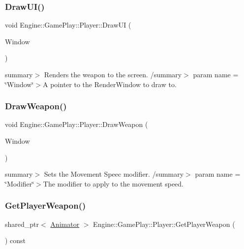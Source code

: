\subsubsection{\texorpdfstring{Draw\+U\+I()}{DrawUI()}}
{\footnotesize\ttfamily void Engine\+::\+Game\+Play\+::\+Player\+::\+Draw\+UI (\begin{DoxyParamCaption}\item[{Render\+Window $\ast$}]{Window }\end{DoxyParamCaption})}

summary$>$ Renders the weapon to the screen. /summary$>$ param name = \char`\"{}\+Window\char`\"{}$>$A pointer to the Render\+Window to draw to.\mbox{\label{class_engine_1_1_game_play_1_1_player_a3705c78e4c21631432c4c21a0a4e4084}} 
\subsubsection{\texorpdfstring{Draw\+Weapon()}{DrawWeapon()}}
{\footnotesize\ttfamily void Engine\+::\+Game\+Play\+::\+Player\+::\+Draw\+Weapon (\begin{DoxyParamCaption}\item[{Render\+Window $\ast$}]{Window }\end{DoxyParamCaption})}

summary$>$ Sets the Movement Speec modifier. /summary$>$ param name = \char`\"{}\+Modifier\char`\"{}$>$The modifier to apply to the movement speed.\mbox{\label{class_engine_1_1_game_play_1_1_player_a270ca0729136ca9105b152c5147bdbf0}} 
\subsubsection{\texorpdfstring{Get\+Player\+Weapon()}{GetPlayerWeapon()}}
{\footnotesize\ttfamily shared\+\_\+ptr$<$ \hyperlink{class_engine_1_1_core_1_1_animator}{Animator} $>$ Engine\+::\+Game\+Play\+::\+Player\+::\+Get\+Player\+Weapon (\begin{DoxyParamCaption}\item[{void}]{ }\end{DoxyParamCaption}) const}

